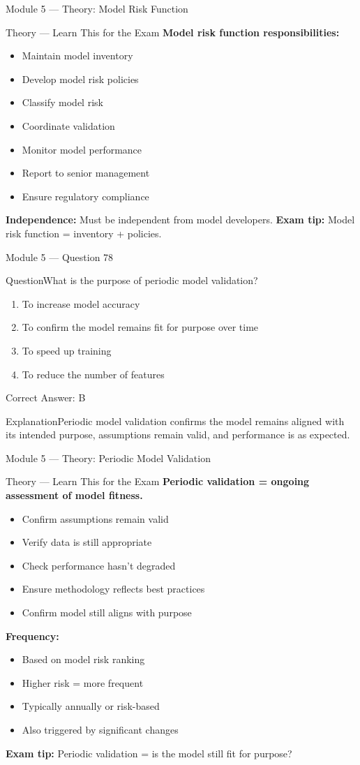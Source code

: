 \documentclass[aspectratio=169,10pt]{beamer}
\newcommand{\question}[1]{\begin{block}{Question}#1\end{block}}
\newcommand{\options}[4]{%
	\begin{enumerate}[label=\Alph*.,leftmargin=*]
		\item #1
		\item #2
		\item #3
		\item #4
	\end{enumerate}
}
\newcommand{\answerbox}[1]{\begin{exampleblock}{Correct Answer: #1}\end{exampleblock}}
\newcommand{\explain}[1]{\begin{block}{Explanation}#1\end{block}}
\newcommand{\theory}[1]{%
	\begin{block}{Theory --- Learn This for the Exam}
		\small #1
	\end{block}
}
\begin{document}
	\begin{frame}{Module 5 --- Theory: Model Risk Function}
		\theory{
			\textbf{Model risk function responsibilities:}
			\begin{itemize}
				\item Maintain model inventory
				\item Develop model risk policies
				\item Classify model risk
				\item Coordinate validation
				\item Monitor model performance
				\item Report to senior management
				\item Ensure regulatory compliance
			\end{itemize}
			\textbf{Independence:} Must be independent from model developers.
			\textbf{Exam tip:} Model risk function = inventory + policies.
		}
	\end{frame}
	
	\begin{frame}{Module 5 --- Question 78}
		\question{What is the purpose of periodic model validation?}
		\options{To increase model accuracy}{To confirm the model remains fit for purpose over time}{To speed up training}{To reduce the number of features}
		\answerbox{B}
		\explain{Periodic model validation confirms the model remains aligned with its intended purpose, assumptions remain valid, and performance is as expected.}
	\end{frame}
	
	\begin{frame}{Module 5 --- Theory: Periodic Model Validation}
		\theory{
			\textbf{Periodic validation = ongoing assessment of model fitness.}
			\begin{itemize}
				\item Confirm assumptions remain valid
				\item Verify data is still appropriate
				\item Check performance hasn't degraded
				\item Ensure methodology reflects best practices
				\item Confirm model still aligns with purpose
			\end{itemize}
			\textbf{Frequency:}
			\begin{itemize}
				\item Based on model risk ranking
				\item Higher risk = more frequent
				\item Typically annually or risk-based
				\item Also triggered by significant changes
			\end{itemize}
			\textbf{Exam tip:} Periodic validation = is the model still fit for purpose?
		}
	\end{frame}
	
\end{document}
